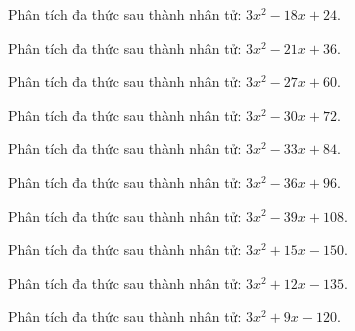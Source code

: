 \begin{bt}
	Phân tích đa thức sau thành nhân tử: $3 x^2 - 18 x + 24$.
\end{bt}
\begin{bt}
	Phân tích đa thức sau thành nhân tử: $3 x^2 - 21 x + 36$.
\end{bt}
\begin{bt}
	Phân tích đa thức sau thành nhân tử: $3 x^2 - 27 x + 60$.
\end{bt}
\begin{bt}
	Phân tích đa thức sau thành nhân tử: $3 x^2 - 30 x + 72$.
\end{bt}
\begin{bt}
	Phân tích đa thức sau thành nhân tử: $3 x^2 - 33 x + 84$.
\end{bt}
\begin{bt}
	Phân tích đa thức sau thành nhân tử: $3 x^2 - 36 x + 96$.
\end{bt}
\begin{bt}
	Phân tích đa thức sau thành nhân tử: $3 x^2 - 39 x + 108$.
\end{bt}
\begin{bt}
	Phân tích đa thức sau thành nhân tử: $3 x^2 + 15 x - 150$.
\end{bt}
\begin{bt}
	Phân tích đa thức sau thành nhân tử: $3 x^2 + 12 x - 135$.
\end{bt}
\begin{bt}
	Phân tích đa thức sau thành nhân tử: $3 x^2 + 9 x - 120$.
\end{bt}
